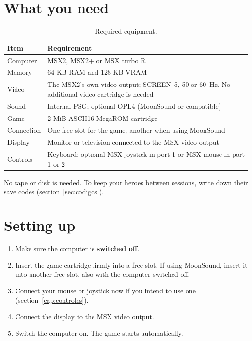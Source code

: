 \chapter{What you need}
\begin{table}[H]\centering\small
\begin{tabularx}{\linewidth}{@{}lL@{}}
\toprule
\textbf{Item} & \textbf{Requirement}\\\midrule
Computer & MSX2, MSX2+ or MSX turbo R\\
Memory & 64 KB RAM and 128 KB VRAM\\
Video & The MSX2's own video output; SCREEN~5, 50 or 60~Hz. No additional video cartridge is needed\\
Sound & Internal PSG; optional OPL4 (MoonSound or compatible)\\
Game & 2 MiB ASCII16 MegaROM cartridge\\
Connection & One free slot for the game; another when using MoonSound\\
Display & Monitor or television connected to the MSX video output\\
Controls & Keyboard; optional MSX joystick in port 1 or MSX mouse in port 1 or 2\\\bottomrule
\end{tabularx}\caption{Required equipment.}\end{table}
No tape or disk is needed. To keep your heroes between sessions, write down their save codes (section~\ref{sec:codigos}).

\chapter{Setting up}
\begin{enumerate}
\item Make sure the computer is \textbf{switched off}.
\item Insert the game cartridge firmly into a free slot. If using MoonSound, insert it into another free slot, also with the computer switched off.
\item Connect your mouse or joystick now if you intend to use one (section~\ref{cap:controles}).
\item Connect the display to the MSX video output.
\item Switch the computer on. The game starts automatically.
\end{enumerate}


